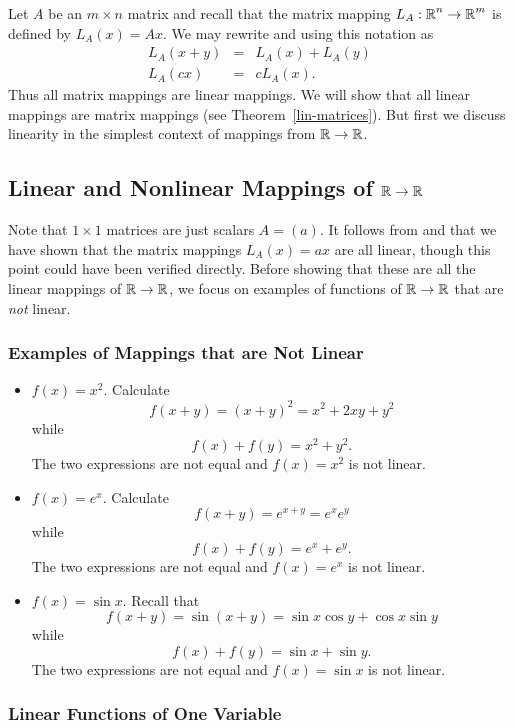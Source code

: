 \documentclass{ximera}
\begin{document}
Let $A$ be an $m\times n$ matrix and recall that the matrix mapping
$L_A:\mbox{$\Bbb{R}$}^n\to\mbox{$\Bbb{R}$}^m$ is defined by $L_A(x)=Ax$.  We may rewrite  and
 using this notation as
\begin{eqnarray*}
L_A(x+y) & = & L_A(x) + L_A(y) \\
L_A(cx) & = & cL_A(x).
\end{eqnarray*}
Thus all matrix mappings are linear
mappings.  We will show that all linear
mappings are matrix mappings (see Theorem~\ref{lin-matrices}).  But first
we discuss linearity in the simplest context of mappings from $\mbox{$\Bbb{R}$}\to\mbox{$\Bbb{R}$}$.

\subsection*{Linear and Nonlinear Mappings of $\mbox{$\Bbb{R}$}\to\mbox{$\Bbb{R}$}$}

Note that $1\times 1$ matrices are just scalars $A=(a)$.  It follows from
 and  that we have shown that the matrix mappings
$L_A(x)=ax$ are all linear, though this point could have been verified
directly.  Before showing that these are all the linear mappings of
$\mbox{$\Bbb{R}$}\to\mbox{$\Bbb{R}$}$, we focus on examples of functions of $\mbox{$\Bbb{R}$}\to\mbox{$\Bbb{R}$}$ that are
{\em not\/} linear.

\subsubsection*{Examples of Mappings that are Not Linear}

\begin{itemize}
\item   $f(x)=x^2$.  Calculate
\[
f(x+y) = (x+y)^2 = x^2+2xy+y^2
\]
while
\[
f(x)+f(y) = x^2 + y^2.
\]
The two expressions are not equal and $f(x)=x^2$ is not linear.
\item   $f(x)=e^x$.  Calculate
\[
f(x+y) = e^{x+y} = e^x e^y
\]
while
\[
f(x)+f(y) = e^x + e^y.
\]
The two expressions are not equal and $f(x)=e^x$ is not linear.
\item   $f(x) = \sin x$.  Recall that
\[
f(x+y) =\sin(x+y) = \sin x \cos y +\cos x \sin y
\]
while
\[
f(x)+f(y) = \sin x + \sin y.
\]
The two expressions are not equal and $f(x)=\sin x $ is not
linear.
\end{itemize}

\subsubsection*{Linear Functions of One Variable}
\end{document}
